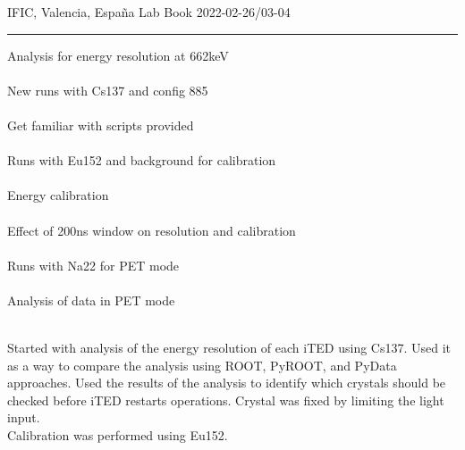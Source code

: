\begin{center}
  {\Large IFIC, Valencia, España} \hfill {\Large Lab Book} \hfill {\Large 2022-02-26/03-04}\\
  \rule{\textwidth}{1pt}
\end{center}

\begin{minipage}[t][0.45\textheight][t]{0.97\linewidth}
  \begin{minipage}[t]{0.49\textwidth}
    \hspace{10pt}Analysis for energy resolution at 662keV\\~\\
    \hspace{10pt}New runs with Cs137 and config 885\\~\\
    \hspace{10pt}Get familiar with scripts provided\\~\\
    \hspace{10pt}Runs with Eu152 and background for calibration\\~\\
    \hspace{10pt}Energy calibration\\~\\
    \hspace{10pt}Effect of 200ns window on resolution and calibration\\~\\
    \hspace{10pt}Runs with Na22 for PET mode\\~\\
    \hspace{10pt}Analysis of data in PET mode\\~\\
  \end{minipage}
  \begin{minipage}[t]{0.49\textwidth}
    \begin{minipage}[t][0.22\textheight][t]{\textwidth}
        Started with analysis of the energy resolution of each iTED using Cs137. Used it as a way to compare the analysis using ROOT, PyROOT, and PyData approaches. Used the results of the analysis to identify which crystals should be checked before iTED restarts operations. Crystal was fixed by limiting the light input.\\
        Calibration was performed using Eu152.
    \end{minipage}
    \begin{minipage}[t][0.22\textheight][t]{\textwidth}
    \end{minipage}
  \end{minipage}  
\end{minipage}


